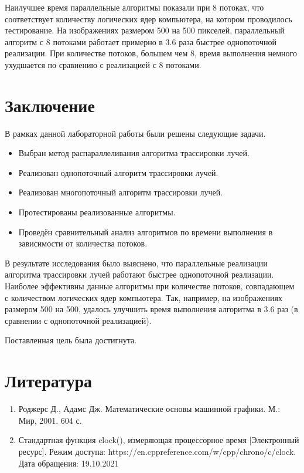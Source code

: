 \documentclass[12pt]{report}
\begin{document}
Наилучшее время параллельные алгоритмы показали при 8 потоках, что соответствует количеству логических ядер компьютера, на котором проводилось тестирование. На изображениях размером 500 на 500 пикселей, параллельный алгоритм с 8 потоками работает примерно в 3.6 раза быстрее однопоточной реализации. При количестве потоков, большем чем 8, время выполнения немного ухудшается по сравнению с реализацией с 8 потоками. 
\chapter*{Заключение}

В рамках данной лабораторной работы были решены следующие задачи.

\begin{itemize}
    \item Выбран метод распараллеливания алгоритма трассировки лучей.
	\item Реализован однопоточный алгоритм трассировки лучей.
	\item Реализован многопоточный алгоритм трассировки лучей.
	\item Протестированы реализованные алгоритмы.
	\item Проведён сравнительный анализ алгоритмов по времени выполнения в зависимости от количества потоков.
\end{itemize}

В результате исследования было выяснено, что параллельные реализации алгоритма трассировки лучей работают быстрее однопоточной реализации. Наиболее эффективны данные алгоритмы при количестве потоков, совпадающем с количеством логических ядер компьютера. Так, например, на изображениях размером 500 на 500, удалось улучшить время выполнения алгоритма в 3.6 раз (в сравнении с однопоточной реализацией).

Поставленная цель была достигнута.

\chapter*{Литература}
\begin{enumerate}
    \item Роджерс Д., Адамс Дж. Математические основы машинной графики. М.: Мир, 2001. 604 с.
	\item Стандартная функция clock(), измеряющая процессорное время [Электронный ресурс]. Режим доступа: https://en.cppreference.com/w/cpp/chrono/c/clock. Дата обращения: 19.10.2021
	
\end{enumerate}
\end{document}
